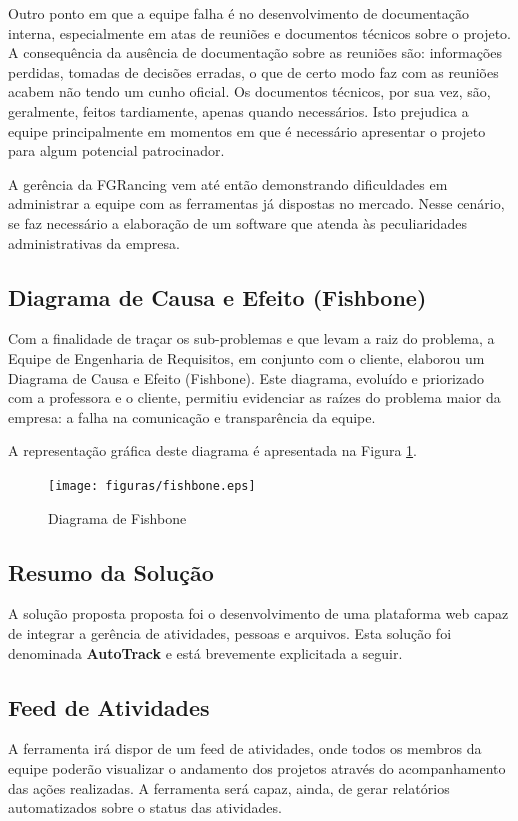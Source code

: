 Outro ponto em que a equipe falha é no desenvolvimento de documentação interna, especialmente em atas de reuniões e documentos
 técnicos sobre o projeto. A consequência da ausência de documentação sobre as reuniões são: informações perdidas, tomadas
  de decisões erradas, o que de certo modo faz com as reuniões acabem não tendo um cunho oficial. Os documentos técnicos,
  por sua vez, são, geralmente, feitos tardiamente, apenas quando necessários. Isto prejudica a equipe principalmente em
  momentos em que é necessário apresentar o projeto para algum potencial patrocinador.

A gerência da FGRancing vem até então demonstrando dificuldades em administrar a equipe com as ferramentas já dispostas
 no mercado. Nesse cenário, se faz necessário a elaboração de um software que atenda às peculiaridades	administrativas
  da empresa.

  \pagebreak
\subsection{Diagrama de Causa e Efeito (Fishbone)}
Com a finalidade de traçar os sub-problemas e que levam a raiz do problema, a Equipe de Engenharia de Requisitos, em conjunto com o cliente, elaborou um Diagrama de Causa e Efeito (Fishbone). Este diagrama, evoluído e priorizado com a professora e o cliente, permitiu evidenciar as raízes do problema maior da empresa: a falha na comunicação e transparência da equipe.

A representação gráfica deste diagrama é apresentada na Figura \ref{fishbone}.

\begin{figure}[!h]
        \centering
        \texttt{[image: figuras/fishbone.eps]}
        \caption{Diagrama de Fishbone\label{fishbone}}
\end{figure}


\subsection{Resumo da Solução}
A solução proposta proposta foi o desenvolvimento de uma plataforma web  capaz de integrar a gerência de atividades, pessoas e arquivos.
Esta solução foi denominada \textbf{AutoTrack} e está brevemente explicitada a seguir.



\subsection{Feed de Atividades}
A ferramenta irá dispor de um feed de atividades, onde todos os membros da equipe poderão visualizar o andamento
 dos projetos através do acompanhamento das ações realizadas. A ferramenta será capaz, ainda, de gerar
  relatórios automatizados sobre o status das atividades.

